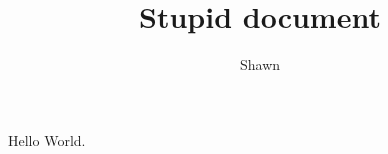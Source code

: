 \documentclass{article}
\title{Stupid document}
\author{Shawn}
\begin{document}
\maketitle

Hello World.  
\end{document}
